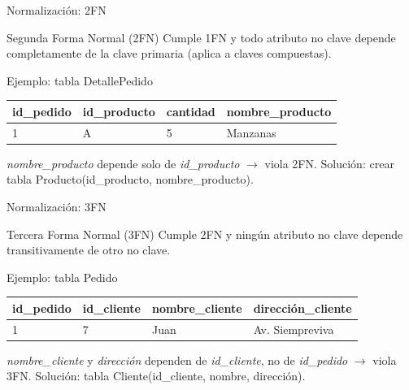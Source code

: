 \documentclass[aspectratio=169, 10pt, xcolor=table]{beamer}
\begin{document}
\begin{frame}{Normalización: 2FN}
    \begin{block}{Segunda Forma Normal (2FN)}
        Cumple 1FN y todo atributo no clave depende completamente de la clave primaria (aplica a claves compuestas).
    \end{block}
    \begin{exampleblock}{Ejemplo: tabla DetallePedido}
        \begin{tabular}{l|l|l|l}
            id\_pedido & id\_producto & cantidad & nombre\_producto \\
            \hline
            1 & A & 5 & Manzanas
        \end{tabular}
        \vspace{0.2cm}
        \newline
        \textit{nombre\_producto} depende solo de \textit{id\_producto} $\rightarrow$ viola 2FN.
        \vspace{0.2cm}
        \newline
        Solución: crear tabla Producto(id\_producto, nombre\_producto).
    \end{exampleblock}
\end{frame}

\begin{frame}{Normalización: 3FN}
    \begin{block}{Tercera Forma Normal (3FN)}
        Cumple 2FN y ningún atributo no clave depende transitivamente de otro no clave.
    \end{block}
    \begin{exampleblock}{Ejemplo: tabla Pedido}
        \begin{tabular}{l|l|l|l}
            id\_pedido & id\_cliente & nombre\_cliente & dirección\_cliente \\
            \hline
            1 & 7 & Juan & Av. Siempreviva
        \end{tabular}
        \vspace{0.2cm}
        \newline
        \textit{nombre\_cliente} y \textit{dirección} dependen de \textit{id\_cliente}, no de \textit{id\_pedido} $\rightarrow$ viola 3FN.
        \vspace{0.2cm}
        \newline
        Solución: tabla Cliente(id\_cliente, nombre, dirección).
    \end{exampleblock}
\end{frame}
\end{document}
